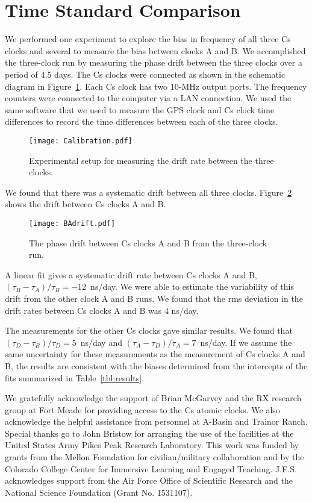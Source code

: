 \documentclass[prb,preprint]{revtex4-1}
\begin{document}
\appendix*   
\section{Time Standard Comparison}
\label{sec:comparison}
We performed one experiment to explore the bias in frequency of all three Cs clocks and several to measure the bias between clocks A and B. We accomplished the three-clock run by measuring the phase drift between the three clocks over a period of 4.5 days.  The Cs clocks were connected as shown in the schematic diagram in Figure~\ref{fig:calibration}. Each Cs clock has two 10-MHz output ports. The frequency counters were connected to the computer via a LAN connection. We used the same software that we used to measure the GPS clock and Cs clock time differences to record the time differences between each of the three clocks.  
\begin{figure}[ht!] 
\centering
\texttt{[image: Calibration.pdf]}
\caption{Experimental setup for measuring the drift rate between the three clocks.}
\label{fig:calibration}
\end{figure}

We found that there was a systematic drift between all three clocks. Figure~\ref{fig:BAdrift} shows the drift between Cs clocks A and B. 
\begin{figure}[ht!] 
\centering
\texttt{[image: BAdrift.pdf]}
\caption{The phase drift between Cs clocks A and B from the three-clock run.}
\label{fig:BAdrift}
\end{figure}
A linear fit gives a systematic drift rate between Cs clocks A and B, $(\tau_B - \tau_A)/\tau_B = -12$~ns/day. We were able to estimate the variability of this drift from the other clock A and B runs. We found that the rms deviation in the drift rates between Cs clocks A and B was 4 ns/day.  

The measurements for the other Cs clocks gave similar results.  We found that $(\tau_D - \tau_B)/\tau_D = 5$~ns/day  and  $(\tau_A - \tau_D)/\tau_A = 7$~ns/day.  If we assume  the same uncertainty for these  measurements as the measurement of Cs clocks A and B, the results are consistent with the  biases determined from the intercepts of the  fits  summarized in  Table~\ref{tbl:results}.

\begin{acknowledgments}

We gratefully acknowledge the support of Brian McGarvey and the RX research group at Fort Meade for providing access to the Cs atomic clocks. We also acknowledge the helpful assistance from personnel at A-Basin and Trainor Ranch. Special thanks go to John Bristow for arranging the use of the facilities at the United States Army Pikes Peak Research Laboratory. This work was funded by grants from the Mellon Foundation for civilian/military collaboration and by the Colorado College Center for Immersive Learning and Engaged Teaching. J.F.S. acknowledges support from the Air Force Office of Scientific Research and the National Science Foundation (Grant No. 1531107).


\end{acknowledgments}
\end{document}
